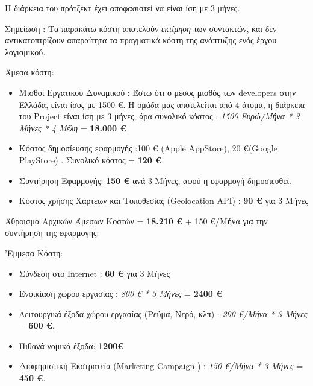 \documentclass{../ol-softwaremanual}
\begin{document}
	\vspace{10pt}
	
	
	Η διάρκεια του πρότζεκτ έχει αποφασιστεί να είναι ίση με 3 μήνες.
	
	\vspace{10pt}
	
	Σημείωση : Τα παρακάτω κόστη αποτελούν \textit{εκτίμηση} των συντακτών, και δεν αντικατοπτρίζουν απαραίτητα τα πραγματικά κόστη της ανάπτυξης ενός έργου λογισμικού. \\
	
	\vspace{10pt}
	
	
	Άμεσα κόστη:
	
	\begin{itemize}
		\item Μισθοί Εργατικού Δυναμικού : Έστω ότι ο μέσος μισθός των \en developers \gr στην Ελλάδα, είναι ίσος με 1500 €. Η ομάδα μας αποτελείται από 4 άτομα, η διάρκεια του \en Project \gr είναι ίση με 3 μήνες, άρα συνολικό κόστος : \textit{1500 Ευρώ/Μήνα * 3 Μήνες * 4 Μέλη  } = \textbf{18.000 €} 
		
		\item Κόστος δημοσίευσης εφαρμογής :100 € (\en Apple AppStore), 20 €(Google PlayStore)  \gr. Συνολικό κόστος = \textbf{120 €}.
		
		\item Συντήρηση Εφαρμογής: \textbf{150 €} ανά 3 Μήνες, αφού η εφαρμογή δημοσιευθεί.
		
		\item Κόστος χρήσης Χάρτεων και Τοποθεσίας (\en Geolocation API\gr) : \textbf{90 €}  για 3 Μήνες
	\end{itemize}
	
	Άθροισμα Αρχικών Άμεσων Κοστών = \textbf{18.210 €} + 150 €/Μήνα για την συντήρηση της εφαρμογής.
	
	\vspace{20pt}
	
	'Εμμεσα Κόστη:
	
	\begin{itemize}
		\item Σύνδεση στο \en Internet \gr : \textbf{60 €} για 3 Μήνες
		\item Ενοικίαση χώρου εργασίας : \textit{800 € * 3 Μήνες} = \textbf{2400 €}
		\item Λειτουργικά έξοδα χώρου εργασίας (Ρεύμα, Νερό, κλπ) : \textit{200 €/Μήνα * 3 Μήνες} = \textbf{600 €}. 
		\item Πιθανά νομικά έξοδα: \textbf{1200€}
		\item Διαφημιστική Εκστρατεία (\en Marketing Campaign \gr) : \textit{150 €/Μήνα * 3 Μήνες} = \textbf{450 €}.
	\end{itemize}
	
\end{document}
